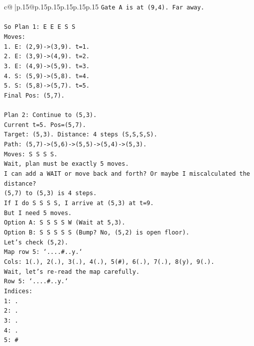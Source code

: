 \documentclass{article}
\begin{document}
{\begin{supertabular}{c@{$\;$}|p{.15\linewidth}@{}p{.15\linewidth}p{.15\linewidth}p{.15\linewidth}p{.15\linewidth}p{.15\linewidth}}
{{{\texttt{Gate A is at (9,4). Far away.} \\
\\ 
\texttt{So Plan 1: E E E S S} \\
\texttt{Moves:} \\
\texttt{1. E: (2,9){-}>(3,9). t=1.} \\
\texttt{2. E: (3,9){-}>(4,9). t=2.} \\
\texttt{3. E: (4,9){-}>(5,9). t=3.} \\
\texttt{4. S: (5,9){-}>(5,8). t=4.} \\
\texttt{5. S: (5,8){-}>(5,7). t=5.} \\
\texttt{Final Pos: (5,7).} \\
\\ 
\texttt{Plan 2: Continue to (5,3).} \\
\texttt{Current t=5. Pos=(5,7).} \\
\texttt{Target: (5,3). Distance: 4 steps (S,S,S,S).} \\
\texttt{Path: (5,7){-}>(5,6){-}>(5,5){-}>(5,4){-}>(5,3).} \\
\texttt{Moves: S S S S.} \\
\texttt{Wait, plan must be exactly 5 moves.} \\
\texttt{I can add a WAIT or move back and forth? Or maybe I miscalculated the distance?} \\
\texttt{(5,7) to (5,3) is 4 steps.} \\
\texttt{If I do S S S S, I arrive at (5,3) at t=9.} \\
\texttt{But I need 5 moves.} \\
\texttt{Option A: S S S S W (Wait at 5,3).} \\
\texttt{Option B: S S S S S (Bump? No, (5,2) is open floor).} \\
\texttt{Let's check (5,2).} \\
\texttt{Map row 5: `....\#..y.`} \\
\texttt{Cols: 1(.), 2(.), 3(.), 4(.), 5(\#), 6(.), 7(.), 8(y), 9(.).} \\
\texttt{Wait, let's re{-}read the map carefully.} \\
\texttt{Row 5: `....\#..y.`} \\
\texttt{Indices:} \\
\texttt{1: .} \\
\texttt{2: .} \\
\texttt{3: .} \\
\texttt{4: .} \\
\texttt{5: \#} \\
}}}
\end{supertabular}}
\end{document}
